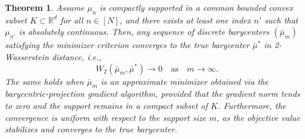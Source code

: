 \documentclass[11pt]{article}
\newtheorem{theorem}{Theorem}[section]
\begin{document}
\begin{theorem}\label{theory:consistency_resolution}
    Assume \(\mu_n\) is compactly supported in a common bounded convex subset \(K \subset \mathbb{R}^d\) for all \(n \in [N]\), and there exists at least one index \(n'\) such that \(\mu_{n'}\) is absolutely continuous. Then, any sequence of discrete barycenters \(( \bar{\mu}_m)\) satisfying the minimizer criterion converges to the true barycenter \(\bar{\mu}^*\) in 2-Wasserstein distance, i.e., 
    \[
    W_2(\bar{\mu}_m, \bar{\mu}^*) \to 0 \quad \text{as} \quad m \to \infty.
    \]
    The same holds when \(\bar{\mu}_m\) is an approximate minimizer obtained via the barycentric-projection gradient algorithm, provided that the gradient norm tends to zero and the support remains in a compact subset of \(K\). Furthermore, the convergence is uniform with respect to the support size \(m\), as the objective value stabilizes and converges to the true barycenter.
\end{theorem}
\end{document}
